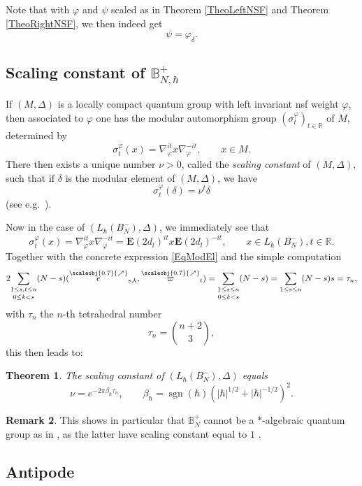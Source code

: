 \documentclass[11pt, reqno]{amsart}
\newtheorem{theorem}{Theorem}[section]
\theoremstyle{definition}
\newtheorem{remark}[theorem]{Remark}
\numberwithin{equation}{section}
\def\R{\mathbb R}
\def\sgn{\operatorname{sgn}}
\newcommand{\Bor}{B}
\newcommand{\nears}{\scaleobj{0.7}{\nearrow}}
\newcommand{\nee}{\overset{\nears}{e}}
\newcommand{\nevarpi}{\overset{\nears}{\varpi}}
\newcommand{\Eb}{\mathbf{E}}
\newcommand{\Bbbb}{\mathbb{B}}
\begin{document}
Note that with $\varphi$ and $\psi$ scaled as in Theorem \ref{TheoLeftNSF} and Theorem \ref{TheoRightNSF}, we then indeed get 
\[
\psi = \varphi_{\delta}. 
\]

\subsection{Scaling constant of  \texorpdfstring{$\Bbbb_{N,\hbar}^+$}{the upper Borel quantum group}} 

If $(M,\Delta)$ is a locally compact quantum group with left invariant nsf weight $\varphi$, then associated to $\varphi$ one has the modular automorphism group $(\sigma_t^{\varphi})_{t\in \R}$ of $M$, determined by 
\[
\sigma_t^{\varphi}(x) = \nabla_{\varphi}^{it}x\nabla_{\varphi}^{-it},\qquad x\in M.
\]
There then exists a unique number $\nu>0$, called the \emph{scaling constant} of $(M,\Delta)$, such that if $\delta$ is the modular element of $(M,\Delta)$, we have
\[
\sigma_t^{\varphi}(\delta) = \nu^t \delta
\]
(see e.g.\ \cite[Proposition 2.13.(18)]{KV03}).

Now in the case of $(L_{\hbar}(\Bor_N^-),\Delta)$, we immediately see that
\[
\sigma_t^{\varphi}(x) = \nabla_{\varphi}^{it}x\nabla_{\varphi}^{-it} = \Eb(2d_l)^{it}x \Eb(2d_l)^{-it},\qquad x\in L_{\hbar}(\Bor_N^-),t\in \R.
\]
Together with the concrete expression \eqref{EqModEl} and the simple computation 
\[
2\underset{0\leq k <s}{\sum_{1\leq s,t\leq n}} (N-s)(\nee_{s,k},\nevarpi_t) = \underset{0\leq k <s}{\sum_{1\leq s\leq n}}(N-s) = \sum_{1\leq s\leq n} (N-s)s = \tau_n,
\]
with $\tau_n$ the $n$-th tetrahedral number
\[
\tau_n = \binom{n+2}{3},
\]
this then leads to:


\begin{theorem}
The scaling constant of $(L_{\hbar}(\Bor_N^-),\Delta)$ equals 
\[
\nu = e^{-2\pi \beta_{\hbar}  \tau_n},\qquad \beta_{\hbar} =  \sgn(\hbar)(|\hbar|^{1/2}+|\hbar|^{-1/2})^2.
\]
\end{theorem} 

\begin{remark}
This shows in particular that $\Bbbb_N^+$ cannot be a $*$-algebraic quantum group as in \cite{VD98}, as the latter have scaling constant equal to $1$ \cite[Theorem 3.4]{DCVD10}. 
\end{remark}

\subsection{Antipode}
\end{document}
